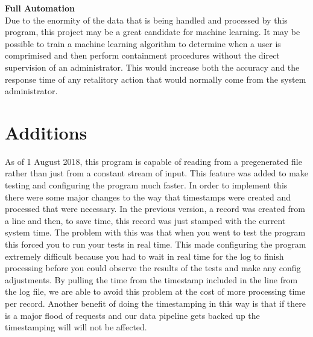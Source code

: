 \documentclass[12pt]{report}
\begin{document}
	\noindent
	\textbf{Full Automation} \\
	Due to the enormity of the data that is being handled and processed by this
	program, this project may be a great candidate for machine learning. It may
	be possible to train a machine learning algorithm to determine when a user
	is comprimised and then perform containment procedures without the direct 
	supervision of an administrator. This would increase both the accuracy and
	the response time of any retalitory action that would normally come from
	the system administrator. \\

\section*{Additions}
	As of 1 August 2018, this program is capable of reading from a pregenerated
	file rather than just from a constant stream of input. This feature was added
	to make testing and configuring the program much faster. In order to implement
	this there were some major changes to the way that timestamps were created and
	processed that were necessary. In the previous version, a record was created
	from a line and then, to save time, this record was just stamped with the 
	current system time. The problem with this was that when you went to test the
	program this forced you to run your tests in real time. This made configuring 
	the program extremely difficult because you had to wait in real time for the 
	log to finish processing before you could observe the results of the tests
	and make any config adjustments. By pulling the time from the timestamp 
	included in the line from the log file, we are able to avoid this problem at 
	the cost of more processing time per record. Another benefit of doing the 
	timestamping in this way is that if there is a major flood of requests and our 
	data pipeline gets backed up the timestamping will will not be affected. 
\end{document}
